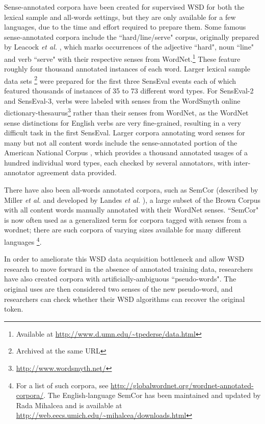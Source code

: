 Sense-annotated corpora have been created for supervised WSD for both the
lexical sample and all-words settings, but they are only available for a few
languages, due to the time and effort required to prepare them.  Some famous
sense-annotated corpora include the ``hard/line/serve" corpus, originally
prepared by Leacock \emph{et al.}
\cite{Leacock:1993:CSS:1075671.1075730,leacock1998using}, which
marks occurrences of the adjective ``hard", noun ``line" and verb ``serve" with
their respective senses from WordNet.\footnote{Available at
\url{http://www.d.umn.edu/~tpederse/data.html}}
These feature roughly four thousand annotated instances of each word. Larger
lexical sample data sets \footnote{Archived at the same URL} 
were prepared for the first three SensEval events
\cite{Kilgarriff98senseval,
      edmonds-cotton:2001:SENSEVAL,
      mihalcea-chklovski-kilgarriff:2004:Senseval-3}
each of which featured thousands of instances of 35 to 73 different
word types. For SensEval-2 and SensEval-3, verbs were labeled with senses from
the WordSmyth online
dictionary-thesaurus\footnote{\url{http://www.wordsmyth.net/}} rather than
their senses from WordNet, as the WordNet sense distinctions for English verbs
are very fine-grained, resulting in a very difficult task in the first
SensEval.
Larger corpora annotating word senses for many but not all content words
include the sense-annotated portion of the American National Corpus
\cite{passonneau2012masc}, which provides a thousand annotated usages of a
hundred individual word types, each checked by several annotators, with
inter-annotator agreement data provided.

There have also been all-words annotated corpora,
such as SemCor (described by Miller \emph{et al.}
\cite{Miller:1993:SC:1075671.1075742} and developed by Landes \emph{et al.}
\cite{landes1998}), a large subset of the Brown Corpus with all
content words manually annotated with their WordNet senses. ``SemCor" is now
often used as a generalized term for corpora tagged with senses from a wordnet;
there are such corpora of varying sizes available for many different
languages \footnote{For a list of such corpora, see
\url{http://globalwordnet.org/wordnet-annotated-corpora/}.
The English-language SemCor has been maintained and updated by Rada Mihalcea
and is available at \url{http://web.eecs.umich.edu/~mihalcea/downloads.html}}.

In order to ameliorate this WSD data acquisition bottleneck and allow WSD
research to move forward in the absence of annotated training data, researchers
have also created corpora with artificially-ambiguous ``pseudo-words".  The
original uses are then considered two senses of the new pseudo-word, and
researchers can check whether their WSD algorithms can recover the original
token.

